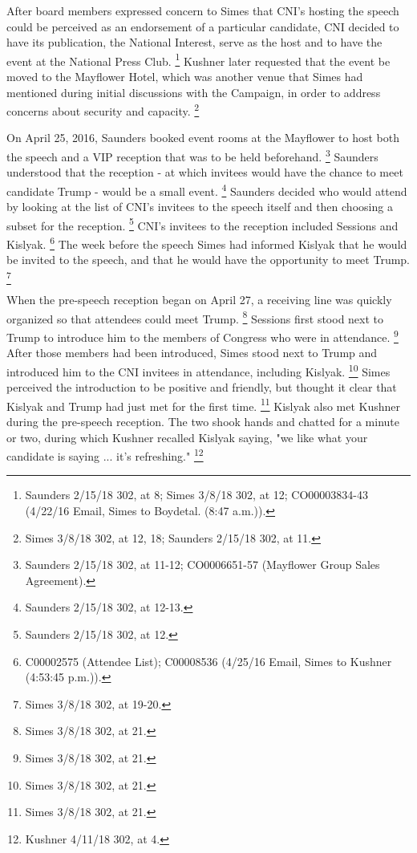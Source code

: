 After board members expressed concern to Simes that CNI's hosting the speech could be perceived as an endorsement of a particular candidate, CNI decided to have its publication, the National Interest, serve as the host and to have the event at the National Press Club.%
\footnote{Saunders 2/15/18 302, at 8;
Simes 3/8/18 302, at 12;
CO00003834-43 (4/22/16 Email, Simes to Boydetal. (8:47 a.m.)).}
Kushner later requested that the event be moved to the Mayflower Hotel, which was another venue that Simes had mentioned during initial discussions with the Campaign, in order to address concerns about security and capacity.%
\footnote{Simes 3/8/18 302, at 12, 18;
Saunders 2/15/18 302, at 11.}

On April 25, 2016, Saunders booked event rooms at the Mayflower to host both the speech and a VIP reception that was to be held beforehand.%
\footnote{Saunders 2/15/18 302, at 11-12;
CO0006651-57 (Mayflower Group Sales Agreement).}
Saunders understood that the reception - at which invitees would have the chance to meet candidate Trump - would be a small event.%
\footnote{Saunders 2/15/18 302, at 12-13.}
Saunders decided who would attend by looking at the list of CNI's invitees to the speech itself and then choosing a subset for the reception.%
\footnote{Saunders 2/15/18 302, at 12.}
CNI's invitees to the reception included Sessions and Kislyak.%
\footnote{C00002575 (Attendee List);
C00008536 (4/25/16 Email, Simes to Kushner (4:53:45 p.m.)).}
The week before the speech Simes had informed Kislyak that he would be invited to the speech, and that he would have the opportunity to meet Trump.%
\footnote{Simes 3/8/18 302, at 19-20.}

When the pre-speech reception began on April 27, a receiving line was quickly organized so that attendees could meet Trump.%
\footnote{Simes 3/8/18 302, at 21.}
Sessions first stood next to Trump to introduce him to the members of Congress who were in attendance.%
\footnote{Simes 3/8/18 302, at 21.}
After those members had been introduced, Simes stood next to Trump and introduced him to the CNI invitees in attendance, including Kislyak.%
\footnote{Simes 3/8/18 302, at 21.}
Simes perceived the introduction to be positive and friendly, but thought it clear that Kislyak and Trump had just met for the first time.%
\footnote{Simes 3/8/18 302, at 21.}
Kislyak also met Kushner during the pre-speech reception.
The two shook hands and chatted for a minute or two, during which Kushner recalled Kislyak saying, "we like what your candidate is saying ... it's refreshing."%
\footnote{Kushner 4/11/18 302, at 4.}


